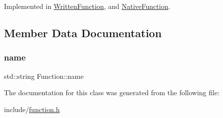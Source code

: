 Implemented in \hyperlink{classWrittenFunction_afe56e5eb6a13f6e38ab5ec87e371d745}{Written\+Function}, and \hyperlink{classNativeFunction_a0f003d805cbc3625e311d1b2a1b861d9}{Native\+Function}.



\subsection{Member Data Documentation}
\mbox{\label{classFunction_a161d1ceb4f67f3222caf429fea7b71f1}} 
\subsubsection{\texorpdfstring{name}{name}}
{\footnotesize\ttfamily std\+::string Function\+::name}



The documentation for this class was generated from the following file\+:\begin{DoxyCompactItemize}
\item 
include/\hyperlink{function_8h}{function.\+h}\end{DoxyCompactItemize}
